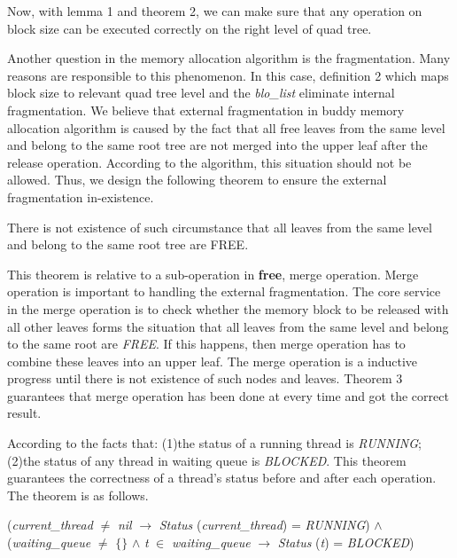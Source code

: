 \documentclass[runningheads]{llncs}
\begin{document}
Now, with lemma 1 and theorem 2, we can make sure that any operation on block size can be executed correctly on the right level of quad tree.

Another question in the memory allocation algorithm is the fragmentation. Many reasons are responsible to this phenomenon. In this case, definition 2 which maps block size to relevant quad tree level and the \textsl{blo\_list} eliminate internal fragmentation. We believe that external fragmentation in buddy memory allocation algorithm is caused by the fact that all free leaves from the same level and belong to the same root tree are not merged into the upper leaf after the release operation. According to the algorithm, this situation should not be allowed. Thus, we design the following theorem to ensure the external fragmentation in-existence.

\begin{theorem}
There is not existence of such circumstance that all leaves from the same level and belong to the same root tree are FREE.
\end{theorem}

This theorem is relative to a sub-operation in \textbf{free}, merge operation. Merge operation is important to handling the external fragmentation. The core service in the merge operation is to check whether the memory block to be released with all other leaves forms the situation that all leaves from the same level and belong to the same root are \textsl{FREE}. If this happens, then merge operation has to combine these leaves into an upper leaf. The merge operation is a inductive progress until there is not existence of such nodes and leaves. Theorem 3 guarantees that merge operation has been done at every time and got the correct result.

According to the facts that: (1)the status of a running thread is \textsl{RUNNING}; (2)the status of any thread in waiting queue is \textsl{BLOCKED}. This theorem guarantees the correctness of a thread's status before and after each operation. The theorem is as follows.

\begin{theorem}
(\textsl{current\_thread} $\neq$ \textsl{nil} $\longrightarrow$ \textsl{Status} (\textsl{current\_thread}) = \textsl{RUNNING}) $\wedge$ (\textsl{waiting\_queue} $\neq$ $\lbrace$$\rbrace$ $\wedge$ \textsl{t} $\in$ \textsl{waiting\_queue} $\longrightarrow$ \textsl{Status} (\textsl{t}) = \textsl{BLOCKED})
\end{theorem}
\end{document}

